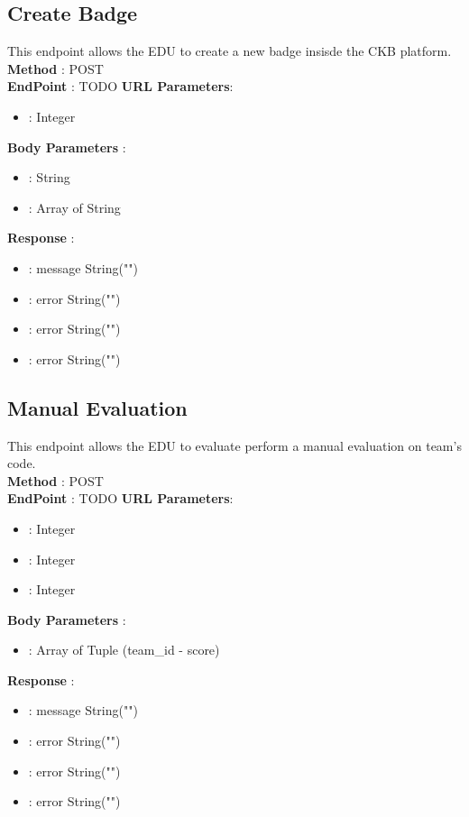 \subsection*{Create Badge}
This endpoint allows the EDU to create a new badge insisde the CKB platform.\\
\textbf{Method} : POST \\
\textbf{EndPoint} : {\color{blue} TODO}
\textbf{URL Parameters}:
\begin{itemize}
    \item {} : Integer
\end{itemize}
\textbf{Body Parameters} :
\begin{itemize}
    \item {} : String
    \item {} : Array of String    
\end{itemize}
\textbf{Response} :
\begin{itemize}
    \item {} : message String("")
    \item {} : error String("")
    \item {} : error String("")
    \item {} : error String("")
\end{itemize}

\subsection*{Manual Evaluation}
This endpoint allows the EDU to evaluate perform a manual evaluation on team's code.\\
\textbf{Method} : POST \\
\textbf{EndPoint} : {\color{blue} TODO}
\textbf{URL Parameters}:
\begin{itemize}
    \item {} : Integer
    \item {} : Integer
    \item {} : Integer
\end{itemize}
\textbf{Body Parameters} :
\begin{itemize}
    \item {} : Array of Tuple (team\_id - score)   
\end{itemize}
\textbf{Response} :
\begin{itemize}
    \item {} : message String("")
    \item {} : error String("")
    \item {} : error String("")
    \item {} : error String("")
\end{itemize}

